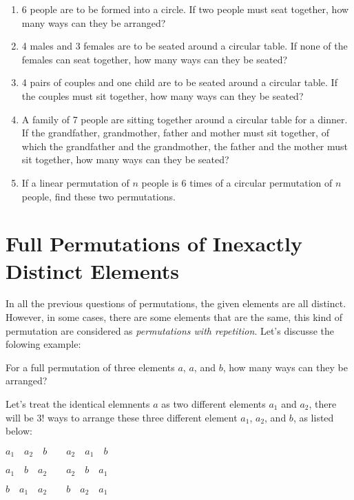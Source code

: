 \documentclass{report}
\begin{document}
\begin{multicols}{2}
\begin{enumerate}
    \item 6 people are to be formed into a circle. If two people must seat together, how many ways can they be arranged?

    \item 4 males and 3 females are to be seated around a circular table. If none of the females can seat together, how many ways can they be seated?

    \item 4 pairs of couples and one child are to be seated around a circular table. If the couples must sit together, how many ways can they be seated?

    \item A family of 7 people are sitting together around a circular table for a dinner.
          If the grandfather, grandmother, father and mother must sit together, of which
          the grandfather and the grandmother, the father and the mother must sit
          together, how many ways can they be seated?

    \item If a linear permutation of $n$ people is 6 times of a circular permutation of
          $n$ people, find these two permutations.
  \end{enumerate}

  \section{Full Permutations of Inexactly Distinct Elements}

  In all the previous questions of permutations, the given elements are all
  distinct. However, in some cases, there are some elements that are the same,
  this kind of permutation are considered as \emph{permutations with repetition}.
  Let's discusse the folowing example:

  For a full permutation of three elements $a$, $a$, and $b$, how many ways can
  they be arranged?

  Let's treat the identical elemnents $a$ as two different elements $a_1$ and
  $a_2$, there will be 3! ways to arrange these three different element $a_1$,
  $a_2$, and $b$, as listed below:

  \begin{center}
    $a_1 \quad a_2 \quad b \qquad a_2 \quad a_1 \quad b$

    $a_1 \quad b \quad a_2 \qquad a_2 \quad b \quad a_1$

    $b \quad a_1 \quad a_2 \qquad b \quad a_2 \quad a_1$
  \end{center}


\end{multicols}
\end{document}
